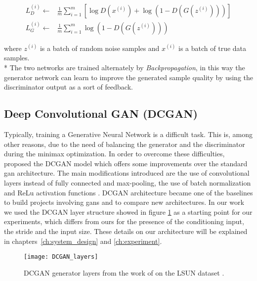 \begin{equation}
\label{eq:ganloss}
\begin{split}
L_{D}^{(i)} \gets & \frac{1}{m} \sum_{i=1}^m \left[
\log D\left({x}^{(i)}\right)
+ \log \left(1-D\left(G\left({z}^{(i)}\right)\right)\right)
\right] \\
L_{G}^{(i)} \gets & \frac{1}{m} \sum_{i=1}^m
\log \left(1-D\left(G\left({z}^{(i)}\right)\right)\right)
\end{split}
\end{equation}

where ${z}^{(i)}$ is a batch of random noise samples and ${x}^{(i)}$ is a batch of true data samples. \\*
The two networks are trained alternately by \textit{Backpropagation}, in this way the generator network can learn to improve the generated sample quality by using the discriminator output as a sort of feedback. 

\subsection{Deep Convolutional GAN (DCGAN)}
Typically, training a Generative Neural Network is a difficult task. This is, among other reasons, due to the need of balancing the generator and the discriminator during the minimax optimization. In order to overcome these difficulties, \citeauthor{gan:dcgan} proposed the DCGAN model \cite{gan:dcgan} which offers some improvements over the standard \gls{gan} architecture. The main modifications introduced are the use of convolutional layers instead of fully connected and max-pooling, the use of batch normalization \cite{batchnorm} and ReLu activation functions \cite{relu}. DCGAN architecture became one of the baselines to build projects involving \glspl{gan} and to compare new architectures. In our work we used the DCGAN layer structure showed in figure \ref{fig:dcganlayers} as a starting point for our experiments, which differs from ours for the presence of the conditioning input, the stride and the input size. These details on our architecture will be explained in chapters~\ref{ch:system_design} and \ref{ch:experiment}.

\begin{figure}[h!]
	\begin{center}
		\texttt{[image: DCGAN\_layers]}
	\end{center}
	
	\captionsetup{width=1\linewidth}
	\caption[Layers  from DCGAN, \citeauthor{gan:dcgan}]{DCGAN generator layers from the work of \citeauthor{gan:dcgan} on the LSUN dataset \cite[p.4]{gan:dcgan}.}
	\label{fig:dcganlayers}
	\medskip
\end{figure}

